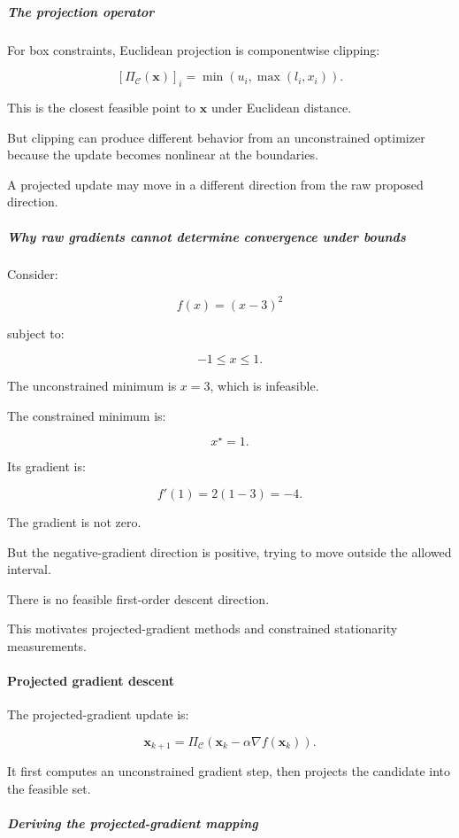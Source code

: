 \subparagraph{The projection operator}\label{the-projection-operator}

For box constraints, Euclidean projection is componentwise clipping:

\[
\boxed{ [\Pi_{\mathcal C}(\mathbf x)]_i = \min(u_i,\max(l_i,x_i)) }.
\]

This is the closest feasible point to \(\mathbf x\) under Euclidean distance.

But clipping can produce different behavior from an unconstrained optimizer because the update becomes nonlinear at the boundaries.

A projected update may move in a different direction from the raw proposed direction.

\subparagraph{Why raw gradients cannot determine convergence under bounds}\label{why-raw-gradients-cannot-determine-convergence-under-bounds}

Consider:

\[
f(x)=(x-3)^2
\]

subject to:

\[
-1\le x\le1.
\]

The unconstrained minimum is \(x=3\), which is infeasible.

The constrained minimum is:

\[
\boxed{x^\star=1}.
\]

Its gradient is:

\[
f'(1)=2(1-3)=-4.
\]

The gradient is not zero.

But the negative-gradient direction is positive, trying to move outside the allowed interval.

There is no feasible first-order descent direction.

This motivates projected-gradient methods and constrained stationarity measurements.

\paragraph{Projected gradient descent}\label{projected-gradient-descent}

The projected-gradient update is:

\[
\boxed{ \mathbf x_{k+1} = \Pi_{\mathcal C} \left( \mathbf x_k-\alpha\nabla f(\mathbf x_k) \right) }.
\]

It first computes an unconstrained gradient step, then projects the candidate into the feasible set.

\subparagraph{Deriving the projected-gradient mapping}\label{deriving-the-projected-gradient-mapping}

